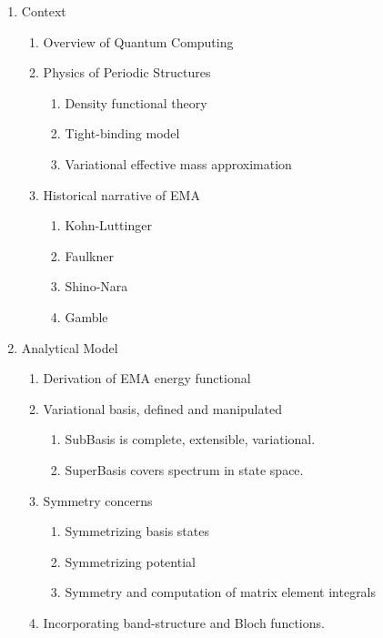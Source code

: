 \documentclass[aps, prl, preprint]{revtex4-2}
\begin{document}
\begin{enumerate}
    \item Context
    \begin{enumerate}
        \item Overview of Quantum Computing
        \item Physics of Periodic Structures
        \begin{enumerate}
            \item Density functional theory
            \item Tight-binding model
            \item Variational effective mass approximation
        \end{enumerate}
        \item Historical narrative of EMA
        \begin{enumerate}
            \item Kohn-Luttinger
            \item Faulkner
            \item Shino-Nara
            \item Gamble
        \end{enumerate}
    \end{enumerate}
    \item Analytical Model
    \begin{enumerate}
        \item Derivation of EMA energy functional
        \item Variational basis, defined and manipulated
        \begin{enumerate}
            \item SubBasis is complete, extensible, variational.
            \item SuperBasis covers spectrum in state space.
        \end{enumerate}
        \item Symmetry concerns
        \begin{enumerate}
            \item Symmetrizing basis states
            \item Symmetrizing potential
            \item Symmetry and computation of matrix element integrals
        \end{enumerate}
        \item Incorporating band-structure and Bloch functions.
        \begin{enumerate}

\end{enumerate}
\end{enumerate}
\end{enumerate}
\end{document}
